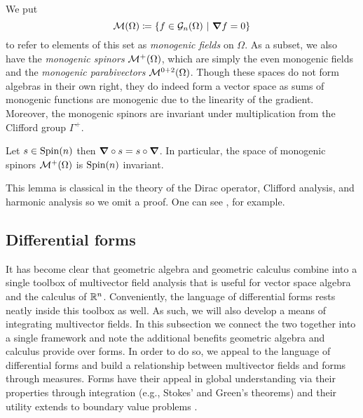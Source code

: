 We put 
\[
\mathcal{M}(\Omega) \coloneqq \{f \in \mathcal{G}_n(\Omega) ~\vert~ \boldsymbol{\nabla} f =0\}
\]
to refer to elements of this set as \emph{monogenic fields} on $\Omega$. As a subset, we also have the \emph{monogenic spinors} $\mathcal{M}^+(\Omega)$, which are simply the even monogenic fields and the \emph{monogenic parabivectors} $\mathcal{M}^{0+2}(\Omega)$. Though these spaces do not form algebras in their own right, they do indeed form a vector space as sums of monogenic functions are monogenic due to the linearity of the gradient.  Moreover, the monogenic spinors are invariant under multiplication from the Clifford group $\Gamma^+$.

\begin{lemma}
\label{lem:clifford_invariant}
Let $s\in \operatorname{Spin}(n)$ then $\boldsymbol{\nabla} \circ s = s \circ \boldsymbol{\nabla}$.  In particular, the space of monogenic spinors $\mathcal{M}^+(\Omega)$ is $\operatorname{Spin}(n)$ invariant.
\end{lemma}
This lemma is classical in the theory of the Dirac operator, Clifford analysis, and harmonic analysis so we omit a proof.  One can see \cite{janssens_special_nodate}, for example.

\subsection{Differential forms}
\label{subsec:diff_forms}
It has become clear that geometric algebra and geometric calculus combine into a single toolbox of multivector field analysis that is useful for vector space algebra and the calculus of $\mathbb{R}^n$. Conveniently, the language of differential forms rests neatly inside this toolbox as well. As such, we will also develop a means of integrating multivector fields. In this subsection we connect the two together into a single framework and note the additional benefits geometric algebra and calculus provide over forms. In order to do so, we appeal to the language of differential forms and build a relationship between multivector fields and forms through measures. Forms have their appeal in global understanding via their properties through integration (e.g., Stokes' and Green's theorems) and their utility extends to boundary value problems \cite{schwarz_hodge_1995}.  

